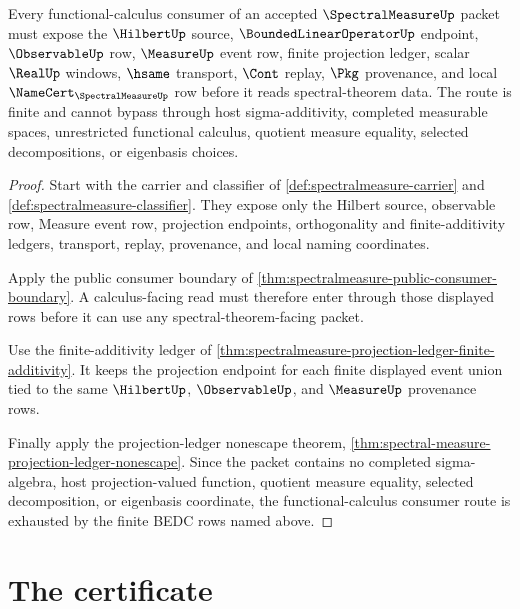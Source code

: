\begin{theorem}
\label{thm:spectralmeasure-functional-calculus-finite-consumer-route}
Every functional-calculus consumer of an accepted $\SpectralMeasureUp$ packet must expose the $\HilbertUp$ source, $\BoundedLinearOperatorUp$ endpoint, $\ObservableUp$ row, $\MeasureUp$ event row, finite projection ledger, scalar $\RealUp$ windows, $\hsame$ transport, $\Cont$ replay, $\Pkg$ provenance, and local $\NameCert_{\SpectralMeasureUp}$ row before it reads spectral-theorem data. The route is finite and cannot bypass through host sigma-additivity, completed measurable spaces, unrestricted functional calculus, quotient measure equality, selected decompositions, or eigenbasis choices.
\end{theorem}
\begin{proof}
Start with the carrier and classifier of \autoref{def:spectralmeasure-carrier} and \autoref{def:spectralmeasure-classifier}. They expose only the Hilbert source, observable row, Measure event row, projection endpoints, orthogonality and finite-additivity ledgers, transport, replay, provenance, and local naming coordinates.

Apply the public consumer boundary of \autoref{thm:spectralmeasure-public-consumer-boundary}. A calculus-facing read must therefore enter through those displayed rows before it can use any spectral-theorem-facing packet.

Use the finite-additivity ledger of \autoref{thm:spectralmeasure-projection-ledger-finite-additivity}. It keeps the projection endpoint for each finite displayed event union tied to the same $\HilbertUp$, $\ObservableUp$, and $\MeasureUp$ provenance rows.

Finally apply the projection-ledger nonescape theorem, \autoref{thm:spectral-measure-projection-ledger-nonescape}. Since the packet contains no completed sigma-algebra, host projection-valued function, quotient measure equality, selected decomposition, or eigenbasis coordinate, the functional-calculus consumer route is exhausted by the finite BEDC rows named above.
\end{proof}

\section{The certificate}
\label{sec:spectralmeasure-certificate}

